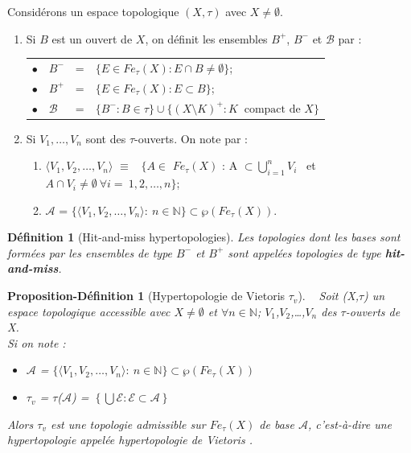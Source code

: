 \documentclass[11pt]{report}
\newenvironment{boxdefinition}
{\begin{tcolorbox}
		[enhanced jigsaw,breakable,pad at break*=1mm,
		colback=black!5!white,boxrule=0pt,frame hidden,
		borderline west={1.5mm}{-2mm}{blue}]}
	{\end{tcolorbox}}
\theoremstyle{styletheorem}
\theoremstyle{styledef}
\newtheorem{definitions}[theoreme]{Définition}
\newtheorem{propozition}[theoreme]{Proposition-Définition}
\theoremstyle{remark}
\newenvironment{definition}{\vspace*{0.3cm}\begin{boxdefinition}\begin{definitions}}{\end{definitions}\end{boxdefinition}\vspace*{0.3cm}}
\newenvironment{propdf}{\vspace*{0.3cm}\begin{boxdefinition}\begin{propozition}}{\end{propozition}\end{boxdefinition}\vspace*{0.3cm}}
\newcommand{\ie}{c'est-à-dire }
\newcommand{\Fe}{\ensuremath{Fe_{\tau}(X)}}
\begin{document}
Considérons un espace topologique $(X,\tau)$  avec $X \neq \emptyset$.
\begin{enumerate} 
	\item Si $B$ est un  ouvert de $X$, on définit les ensembles $B^+$, $B^-$ et $\mathcal{B}$ par :\\
	\begin{tabular}{rlcl}
		$\bullet$ &$B^-$ &=&  $\lbrace E \in Fe_\tau (X) : E \cap B \neq \emptyset \rbrace $; \\
		$\bullet$ &$B^+$ &=& $\lbrace E \in Fe_\tau (X) : E \subset B \rbrace$; \\ 
		$\bullet$&$\mathcal{B}$ &= &$\lbrace B^- \colon B \in \tau \rbrace \cup \lbrace (X\setminus K)^+\colon  K\ \text{ compact de } X \rbrace $ 
	\end{tabular}
	\item Si $V_1,\dots,V_n$ sont des $\tau$-ouverts. On note par :
	\begin{enumerate}[label = $\bullet$]
		\item  $ \langle V_1,V_2,\dots, V_n  \rangle$   $\equiv $~ $\lbrace A  \in  $ $Fe_{\tau}(X)$ : A $ \subset \bigcup_{i=1}^{n} V_i$ ~et ~$ A \cap V_i \neq \emptyset \  \forall i =~ 1,2,\dots,n \rbrace$;
		\item $ \mathcal{A}$ =  $\lbrace \langle V_1,V_2,\dots, V_n \rangle : \ n \in \mathbb{N} \rbrace \subset \wp (Fe_{\tau}(X) )$.
	\end{enumerate}
\end{enumerate}  
\begin{definition}[Hit-and-miss hypertopologies] \label{hit}
	Les topologies dont les bases sont formées par les ensembles de type $B^-$ et $B^+$ sont appelées topologies de type \textbf{\textit{hit-and-miss}}.
\end{definition}
\begin{propdf}[Hypertopologie de Vietoris $\tau_v$]
	\ 
	\newline
	Soit (X,$ \tau $) un espace topologique accessible avec  $X \neq \emptyset$ et $ \forall n \in \mathbb{N} $; $ V_1 $,$ V_2$,\dots,$ V_n $ des $ \tau $-ouverts de X.\\ 
	Si on note :
	\begin{itemize}
		\item $ \mathcal{A}$ =  $\lbrace \langle V_1,V_2,\dots, V_n \rangle : \ n \in \mathbb{N} \rbrace \subset \wp (Fe_{\tau}(X) )$
		\item $ \tau_v $ = $\tau$($\mathcal{A}$) = $ \left\lbrace \bigcup \mathcal{E} : \mathcal{E} \subset \mathcal{A} \right\rbrace$
	\end{itemize}
	Alors $\tau_v$ est une topologie admissible sur $\Fe$ de base $\mathcal{A}$, \ie une hypertopologie appelée hypertopologie de Vietoris \cite{b7}.
\end{propdf}
\end{document}
